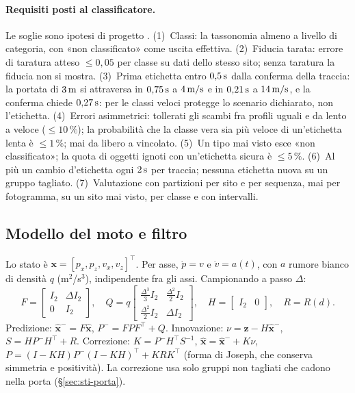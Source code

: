 \paragraph{Requisiti posti al classificatore.} Le soglie sono ipotesi di progetto . (1)~Classi: la tassonomia almeno a livello di categoria, con «non classificato» come uscita effettiva. (2)~Fiducia tarata: errore di taratura atteso $\le0{,}05$ per classe su dati dello stesso sito; senza taratura la fiducia non si mostra. (3)~Prima etichetta entro $0{,}5\,\mathrm{s}$ dalla conferma della traccia: la portata di $3\,\mathrm{m}$ si attraversa in $0{,}75\,\mathrm{s}$ a $4\,\mathrm{m/s}$ e in $0{,}21\,\mathrm{s}$ a $14\,\mathrm{m/s}$, e la conferma chiede $0{,}27\,\mathrm{s}$: per le classi veloci protegge lo scenario dichiarato, non l'etichetta. (4)~Errori asimmetrici: tollerati gli scambi fra profili uguali e da lento a veloce ($\le10\,\%$); la probabilità che la classe vera sia più veloce di un'etichetta lenta è $\le1\,\%$; mai da libero a vincolato. (5)~Un tipo mai visto esce «non classificato»; la quota di oggetti ignoti con un'etichetta sicura è $\le5\,\%$. (6)~Al più un cambio d'etichetta ogni $2\,\mathrm{s}$ per traccia; nessuna etichetta nuova su un gruppo tagliato. (7)~Valutazione con partizioni per sito e per sequenza, mai per fotogramma, su un sito mai visto, per classe e con intervalli.

\subsection{Modello del moto e filtro}\label{sec:sti-filtro}

Lo stato è $\mathbf x=[p_x,p_z,v_x,v_z]^{\top}$. Per asse, $\dot p=v$ e $\dot v=a(t)$, con $a$ rumore bianco di densità $q$ (m$^2$/s$^3$), indipendente fra gli assi. Campionando a passo $\Delta$:
\begin{equation}\label{eq:sti-modello}
F=\begin{bmatrix}I_2&\Delta I_2\\0&I_2\end{bmatrix},\quad
Q=q\begin{bmatrix}\tfrac{\Delta^3}{3}I_2&\tfrac{\Delta^2}{2}I_2\\[2pt]\tfrac{\Delta^2}{2}I_2&\Delta I_2\end{bmatrix},\quad
H=\begin{bmatrix}I_2&0\end{bmatrix},\quad R=R(d).
\end{equation}
Predizione: $\hat{\mathbf x}^-=F\hat{\mathbf x}$, $P^-=FPF^{\top}+Q$. Innovazione: $\nu=\mathbf z-H\hat{\mathbf x}^-$, $S=HP^-H^{\top}+R$. Correzione: $K=P^-H^{\top}S^{-1}$, $\hat{\mathbf x}=\hat{\mathbf x}^-+K\nu$, $P=(I-KH)P^-(I-KH)^{\top}+KRK^{\top}$ (forma di Joseph, che conserva simmetria e positività). La correzione usa solo gruppi non tagliati che cadono nella porta (\S\ref{sec:sti-porta}).

